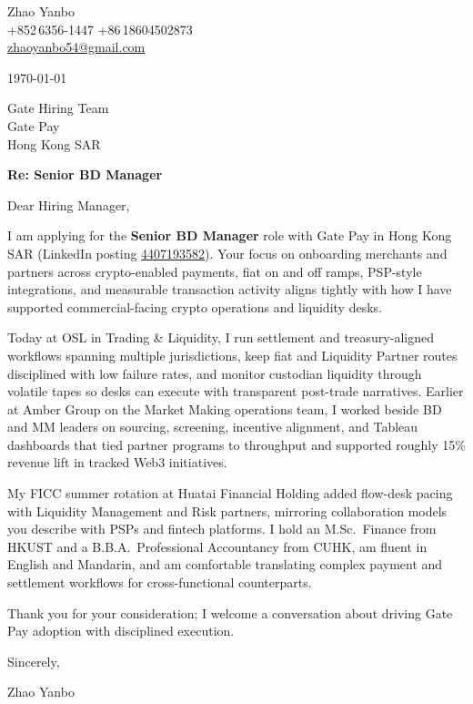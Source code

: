 \documentclass[10pt,a4paper]{article}
\begin{document}
\begin{flushleft}
  Zhao Yanbo\\
  +852\,6356-1447 \;\textbar\; +86\,18604502873\\
  \href{mailto:zhaoyanbo54@gmail.com}{zhaoyanbo54@gmail.com}
\end{flushleft}

\vspace{1em}

\begin{flushright}
  \today
\end{flushright}

\vspace{0.75em}

Gate Hiring Team\\
Gate Pay\\
Hong Kong SAR

\vspace{1em}

\textbf{Re: Senior BD Manager}

\vspace{0.75em}

Dear Hiring Manager,

I am applying for the \textbf{Senior BD Manager} role with Gate Pay in Hong Kong SAR (LinkedIn posting \href{https://www.linkedin.com/jobs/view/4407193582/}{4407193582}). Your focus on onboarding merchants and partners across crypto-enabled payments, fiat on and off ramps, PSP-style integrations, and measurable transaction activity aligns tightly with how I have supported commercial-facing crypto operations and liquidity desks.

Today at OSL in Trading \& Liquidity, I run settlement and treasury-aligned workflows spanning multiple jurisdictions, keep fiat and Liquidity Partner routes disciplined with low failure rates, and monitor custodian liquidity through volatile tapes so desks can execute with transparent post-trade narratives. Earlier at Amber Group on the Market Making operations team, I worked beside BD and MM leaders on sourcing, screening, incentive alignment, and Tableau dashboards that tied partner programs to throughput and supported roughly 15\% revenue lift in tracked Web3 initiatives.

My FICC summer rotation at Huatai Financial Holding added flow-desk pacing with Liquidity Management and Risk partners, mirroring collaboration models you describe with PSPs and fintech platforms. I hold an M.Sc.\ Finance from HKUST and a B.B.A.\ Professional Accountancy from CUHK, am fluent in English and Mandarin, and am comfortable translating complex payment and settlement workflows for cross-functional counterparts.

Thank you for your consideration; I welcome a conversation about driving Gate Pay adoption with disciplined execution.

\vspace{1em}

Sincerely,

\vspace{2em}

Zhao Yanbo
\end{document}

